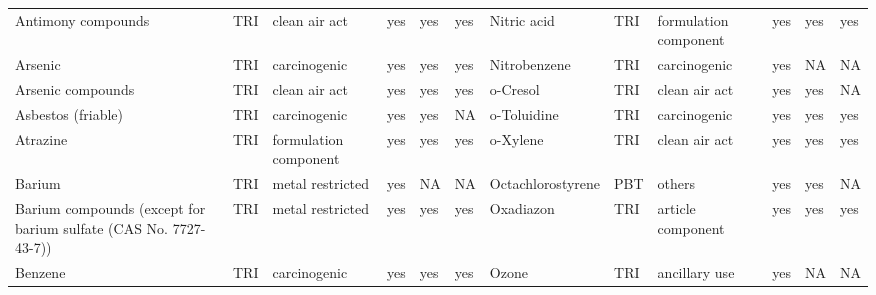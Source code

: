 \begin{table}[H]
{\begin{tabular}{llllllllllll}
            Antimony compounds                                                         & TRI            & clean air act         & yes    & yes     & yes  & Nitric acid                                                                                                        & TRI            & formulation component & yes & yes & yes\\
            Arsenic                                                                    & TRI            & carcinogenic          & yes    & yes     & yes  & Nitrobenzene                                                                                                       & TRI            & carcinogenic          & yes    & NA      & NA   \\
            Arsenic compounds                                                          & TRI            & clean air act         & yes    & yes     & yes  & o-Cresol                                                                                                           & TRI            & clean air act         & yes    & yes & NA\\
            Asbestos (friable)                                                         & TRI            & carcinogenic          & yes    & yes     & NA   & o-Toluidine                                                                                                        & TRI            & carcinogenic          & yes    & yes & yes\\
            Atrazine                                                                   & TRI            & formulation component & yes    & yes     & yes  & o-Xylene                                                                                                           & TRI            & clean air act         & yes    & yes & yes\\
            Barium                                                                     & TRI            & metal restricted      & yes    & NA      & NA   & Octachlorostyrene                                                                                                  & PBT            & others                & yes    & yes     & NA   \\
            Barium compounds (except for barium sulfate (CAS No. 7727-43-7))           & TRI            & metal restricted & yes & yes & yes & Oxadiazon & TRI & article component & yes & yes & yes\\
            Benzene                                                                    & TRI            & carcinogenic          & yes    & yes     & yes  & Ozone                                                                                                              & TRI            & ancillary use         & yes    & NA      & NA   \\

\end{tabular}}
\end{table}
